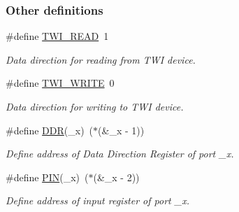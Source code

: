 \subsubsection*{Other definitions}
\begin{DoxyCompactItemize}
\item 
\#define \hyperlink{a00008_gaaf9a8abccd811954f9cc316f2b2f87b3}{T\+W\+I\+\_\+\+R\+E\+AD}~1\hypertarget{a00008_gaaf9a8abccd811954f9cc316f2b2f87b3}{}\label{a00008_gaaf9a8abccd811954f9cc316f2b2f87b3}

\begin{DoxyCompactList}\small\item\em Data direction for reading from T\+WI device. \end{DoxyCompactList}\item 
\#define \hyperlink{a00008_ga3b68e8e777b71520f9dbfac733774d5f}{T\+W\+I\+\_\+\+W\+R\+I\+TE}~0\hypertarget{a00008_ga3b68e8e777b71520f9dbfac733774d5f}{}\label{a00008_ga3b68e8e777b71520f9dbfac733774d5f}

\begin{DoxyCompactList}\small\item\em Data direction for writing to T\+WI device. \end{DoxyCompactList}\item 
\#define \hyperlink{a00008_ga6c0346728feb274834cad94daca316ee}{D\+DR}(\+\_\+x)~($\ast$(\&\+\_\+x -\/ 1))\hypertarget{a00008_ga6c0346728feb274834cad94daca316ee}{}\label{a00008_ga6c0346728feb274834cad94daca316ee}

\begin{DoxyCompactList}\small\item\em Define address of Data Direction Register of port \+\_\+x. \end{DoxyCompactList}\item 
\#define \hyperlink{a00008_ga740f9eb9c9f9e33500ee61ec53945f6a}{P\+IN}(\+\_\+x)~($\ast$(\&\+\_\+x -\/ 2))\hypertarget{a00008_ga740f9eb9c9f9e33500ee61ec53945f6a}{}\label{a00008_ga740f9eb9c9f9e33500ee61ec53945f6a}

\begin{DoxyCompactList}\small\item\em Define address of input register of port \+\_\+x. \end{DoxyCompactList}\end{DoxyCompactItemize}
